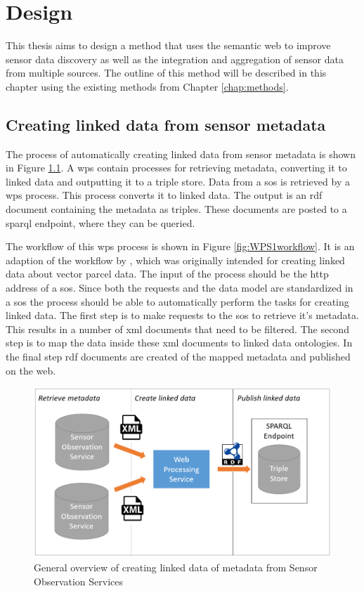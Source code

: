 

\chapter{Design}
\label{chap:design}

This thesis aims to design a method that uses the semantic web to improve sensor data discovery as well as the integration and aggregation of sensor data from multiple sources. The outline of this method will be described in this chapter using the existing methods from Chapter \ref{chap:methods}. 

\section{Creating linked data from sensor metadata}

The process of automatically creating linked data from sensor metadata is shown in Figure \ref{fig:WPS1}. A \ac{wps} contain processes for retrieving metadata, converting it to linked data and outputting it to a triple store. Data from a \ac{sos} is retrieved by a \ac{wps} process. This process converts it to linked data. The output is an \ac{rdf} document containing the metadata as triples. These documents are posted to a \ac{sparql} endpoint, where they can be queried.  

The workflow of this \ac{wps} process is shown in Figure \ref{fig:WPS1workflow}. It is an adaption of the workflow by \cite{LD:Missier}, which was originally intended for creating linked data about vector parcel data. The input of the process should be the \ac{http} address of a \ac{sos}. Since both the requests and the data model are standardized in a \ac{sos} the process should be able to automatically perform the tasks for creating linked data. The first step is to make requests to the \ac{sos} to retrieve it's metadata. This results in a number of \ac{xml} documents that need to be filtered. The second step is to map the data inside these \ac{xml} documents to linked data ontologies. In the final step \ac{rdf} documents are created of the mapped metadata and published on the web.  

\begin{figure}
	\centering
	\includegraphics[width=0.8\linewidth]{UML/wps1diagram.PNG}
	\caption{General overview of creating linked data of metadata from Sensor Observation Services}
	\label{fig:WPS1}
\end{figure}


